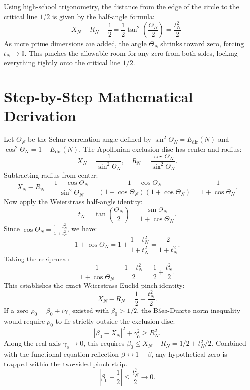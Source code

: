 \documentclass[11pt,a4paper]{article}
\theoremstyle{definition}
\begin{document}
Using high-school trigonometry, the distance from the edge of the circle to the critical line $1/2$ is given by the half-angle formula:
\begin{equation}
X_N - R_N - \frac{1}{2} = \frac{1}{2} \tan^2\left(\frac{\Theta_N}{2}\right) = \frac{t_N^2}{2}.
\end{equation}
As more prime dimensions are added, the angle $\Theta_N$ shrinks toward zero, forcing $t_N \to 0$. This pinches the allowable room for any zero from both sides, locking everything tightly onto the critical line $1/2$.


\section{Step-by-Step Mathematical Derivation}

Let $\Theta_N$ be the Schur correlation angle defined by $\sin^2\Theta_N = E_{\mathrm{dir}}(N)$ and $\cos^2\Theta_N = 1 - E_{\mathrm{dir}}(N)$. The Apollonian exclusion disc has center and radius:
\begin{equation}
X_N = \frac{1}{\sin^2\Theta_N}, \quad R_N = \frac{\cos\Theta_N}{\sin^2\Theta_N}.
\end{equation}
Subtracting radius from center:
\begin{equation}
X_N - R_N = \frac{1 - \cos\Theta_N}{\sin^2\Theta_N} = \frac{1 - \cos\Theta_N}{(1 - \cos\Theta_N)(1 + \cos\Theta_N)} = \frac{1}{1 + \cos\Theta_N}.
\end{equation}
Now apply the Weierstrass half-angle identity:
\begin{equation}
t_N = \tan\left(\frac{\Theta_N}{2}\right) = \frac{\sin\Theta_N}{1 + \cos\Theta_N}.
\end{equation}
Since $\cos\Theta_N = \frac{1 - t_N^2}{1 + t_N^2}$, we have:
\begin{equation}
1 + \cos\Theta_N = 1 + \frac{1 - t_N^2}{1 + t_N^2} = \frac{2}{1 + t_N^2}.
\end{equation}
Taking the reciprocal:
\begin{equation}
\frac{1}{1 + \cos\Theta_N} = \frac{1 + t_N^2}{2} = \frac{1}{2} + \frac{t_N^2}{2}.
\end{equation}
This establishes the exact Weierstrass-Euclid pinch identity:
\begin{equation}
X_N - R_N = \frac{1}{2} + \frac{t_N^2}{2}.
\end{equation}
If a zero $\rho_0 = \beta_0 + i \gamma_0$ existed with $\beta_0 > 1/2$, the Báez-Duarte norm inequality would require $\rho_0$ to lie strictly outside the exclusion disc:
\begin{equation}
|\beta_0 - X_N|^2 + \gamma_0^2 \ge R_N^2.
\end{equation}
Along the real axis $\gamma_0 \to 0$, this requires $\beta_0 \le X_N - R_N = 1/2 + t_N^2/2$. Combined with the functional equation reflection $\beta \leftrightarrow 1 - \beta$, any hypothetical zero is trapped within the two-sided pinch strip:
\begin{equation}
\left|\beta_0 - \frac{1}{2}\right| \le \frac{t_N^2}{2} \to 0.
\end{equation}
\end{document}

